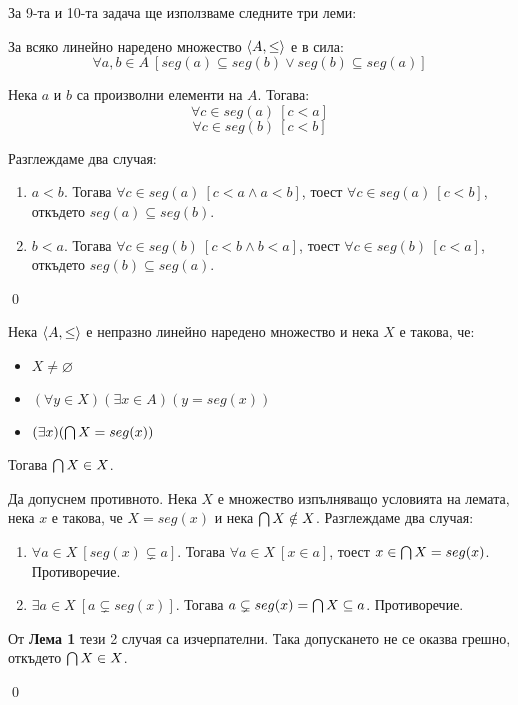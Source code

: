 \quad
За 9-та и 10-та задача ще използваме следните три леми:

\begin{tcolorbox}[mybox={Лема 1}, colback=purple!20, colframe=purple!40]
\quad
За всяко линейно наредено множество $\langle A, \leq \rangle$ е в сила:
\[
\forall a, b \in A\ [ seg(a) \subseteq seg(b) \lor seg(b) \subseteq seg(a)]
\]
\end{tcolorbox}

\begin{tcolorbox}[mybox={Доказателство:}]
\quad
Нека $a$ и $b$ са произволни елементи на $A$.
Тогава:
\[
\forall c \in seg(a) \ [c < a]
\]
\[
\forall c \in seg(b) \ [c < b]
\]

\quad
Разглеждаме два случая:
\begin{enumerate}[label={\arabic* сл.}]
\item
$a<b$.
Тогава $\forall c \in seg(a) \ [c<a \land a<b]$, тоест $\forall c \in seg(a) \ [c<b]$, откъдето $seg(a) \subseteq seg(b)$.

\item
$b<a$.
Тогава $\forall c \in seg(b) \ [c<b \land b<a]$, тоест $\forall c \in seg(b) \ [c<a]$, откъдето $seg(b) \subseteq seg(a)$.

\end{enumerate}
\qed
\end{tcolorbox}

\begin{tcolorbox}[mybox={Лема 2}, colback=purple!20, colframe=purple!40]

\quad
Нека $\langle A, \leq \rangle$ е непразно линейно наредено множество и нека $X$ е такова, че:
\begin{itemize}
\item
$X \neq \varnothing$
\item
$(\forall y \in X)(\exists x \in A)(y = seg(x))$
\item
$(\exists x)(\bigcap X = seg(x))$
\end{itemize}

\quad
Тогава $\bigcap X \in X$.
\end{tcolorbox}

\begin{tcolorbox}[mybox={Доказателство:}]
\quad
Да допуснем противното.
Нека $X$ е множество изпълняващо условията на лемата, нека $x$ е такова, че $X = seg(x)$ и нека $\bigcap X \notin X$.
Разглеждаме два случая:
\begin{enumerate}[label={\arabic* сл.}]
\item
$\forall a \in X\ [seg(x) \subsetneq a]$.
Тогава $\forall a \in X\ [x \in a]$, тоест $x \in \bigcap X = seg(x)$. Противоречие.
\item
$\exists a \in X\ [a \subsetneq seg(x) ]$.
Тогава $a \subsetneq seg(x) = \bigcap X \subseteq a$. Противоречие.
\end{enumerate}

\quad
От \textbf{Лема 1} тези 2 случая са изчерпателни.
Така допускането не се оказва грешно, откъдето $\bigcap X \in X$.

\qed


\end{tcolorbox}

